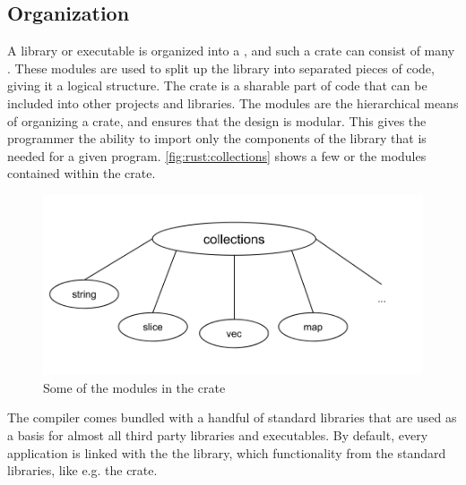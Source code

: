 \subsection{Organization}
\label{ssub:rust:organization}

A {\rust} library or executable is organized into a , and such a crate can consist of many .
These modules are used to split up the library into separated pieces of code, giving it a logical structure.
The crate is a sharable part of {\rust} code that can be included into other projects and libraries.
The modules are the hierarchical means of organizing a crate, and ensures that the design is modular.
This gives the programmer the ability to import only the components of the library that is needed for a given program.
\autoref{fig:rust:collections} shows a few or the modules contained within the {\rust}  crate.

\begin{figure}[H]
  \begin{center}
    \includegraphics[scale=0.3]{figures/background/rust/libcollections.png}
  \end{center}
  \caption{Some of the modules in the  crate}
  \label{fig:rust:collections}
\end{figure}

The {\rust} compiler comes bundled with a handful of standard libraries that are used as a basis for almost all third party libraries and executables.
By default, every {\rust} application is linked with the the {\rust} {\std} library, which  functionality from the standard libraries, like e.g. the  crate.
%

